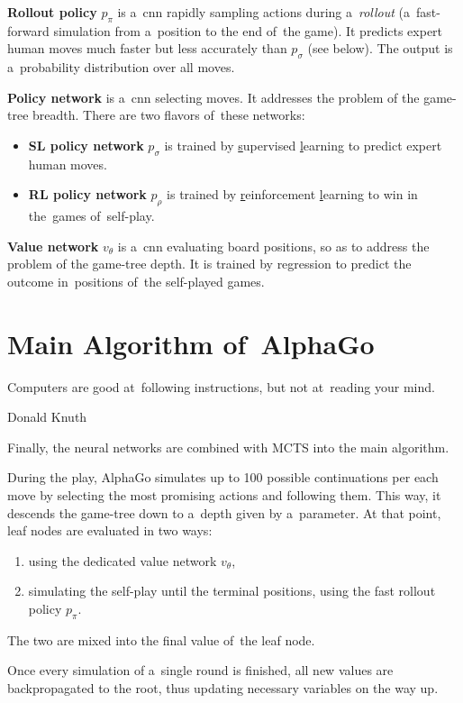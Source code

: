 \textbf{Rollout policy} $p_\pi$ is a~\acrshort{cnn} rapidly sampling actions during a~\emph{rollout} (a~fast-forward simulation from a~position to the end of~the game).
It predicts expert human moves much faster but less accurately than $p_\sigma$ (see below).
The output is a~probability distribution over all moves.

\textbf{Policy network} is a~\acrshort{cnn} selecting moves.
It addresses the problem of the game-tree breadth.
There are two flavors of~these networks:
\begin{itemize}
  \item \textbf{SL policy network} $p_\sigma$ is trained by \underline{s}upervised \underline{l}earning to predict expert human moves.
  \item \textbf{RL policy network} $p_\rho$ is trained by \underline{r}einforcement \underline{l}earning to win in the~games of~self-play.
\end{itemize}

\textbf{Value network} $v_\theta$ is a~\acrshort{cnn} evaluating board positions, so as to address the problem of the game-tree depth.
It is trained by regression to predict the outcome in~positions of~the self-played games.

\section{Main Algorithm of~AlphaGo}
\epigraph{
  Computers are good at~following instructions, but not at~reading your mind.
}{Donald Knuth}
Finally, the neural networks are combined with MCTS into the main algorithm.

During the play, AlphaGo simulates up to 100 possible continuations per each move by selecting the most promising actions and following them.
This way, it descends the game-tree down to a~depth given by a~parameter.
At that point, leaf nodes are evaluated in two ways:
\begin{enumerate}[(1)]
  \item using the dedicated value network $v_\theta$,
  \item simulating the self-play until the terminal positions, using the fast rollout policy $p_\pi$.
\end{enumerate}
The two are mixed into the final value of~the leaf node.

Once every simulation of a~single round is finished, all new values are backpropagated to the root, thus updating necessary variables on the way up.

